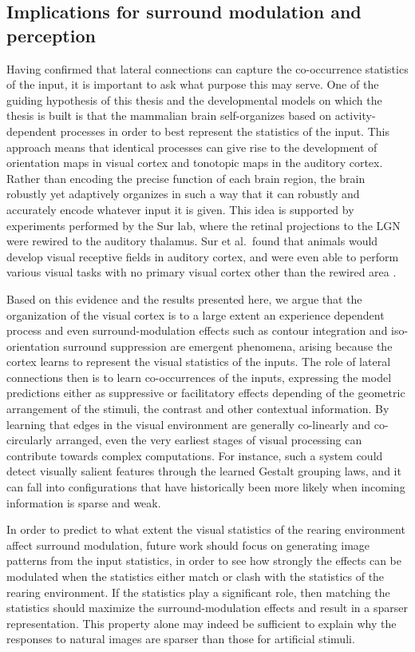 \subsection{Implications for surround modulation and perception}

Having confirmed that lateral connections can capture the
co-occurrence statistics of the input, it is important to ask what
purpose this may serve. One of the guiding hypothesis of this thesis
and the developmental models on which the thesis is built is that the
mammalian brain self-organizes based on activity-dependent processes
in order to best represent the statistics of the input. This approach
means that identical processes can give rise to the development of
orientation maps in visual cortex and tonotopic maps in the auditory
cortex. Rather than encoding the precise function of each brain
region, the brain robustly yet adaptively organizes in such a way that
it can robustly and accurately encode whatever input it is given. This
idea is supported by experiments performed by the Sur lab, where the
retinal projections to the LGN were rewired to the auditory thalamus.
Sur et al.\ found that animals would develop visual receptive fields
in auditory cortex, and were even able to perform various visual tasks
with no primary visual cortex other than the rewired area
\citep{vonMelchner2000}.

Based on this evidence and the results presented here, we argue that
the organization of the visual cortex is to a large extent an
experience dependent process and even surround-modulation effects such
as contour integration and iso-orientation surround suppression are
emergent phenomena, arising because the cortex learns to represent the
visual statistics of the inputs. The role of lateral connections then
is to learn co-occurrences of the inputs, expressing the model
predictions either as suppressive or facilitatory effects depending of
the geometric arrangement of the stimuli, the contrast and other
contextual information. By learning that edges in the visual
environment are generally co-linearly and co-circularly arranged, even
the very earliest stages of visual processing can contribute towards
complex computations.  For instance, such a system could detect
visually salient features through the learned Gestalt grouping laws,
and it can fall into configurations that have historically been more
likely when incoming information is sparse and weak.

In order to predict to what extent the visual statistics of the
rearing environment affect surround modulation, future
work should focus on generating image patterns from the input
statistics, in order to see how strongly the effects can be modulated
when the statistics either match or clash with the statistics of the
rearing environment. If the statistics play a significant role, then
matching the statistics should maximize the surround-modulation
effects and result in a sparser representation. This property alone
may indeed be sufficient to explain why the responses to natural
images are sparser than those for artificial stimuli.

